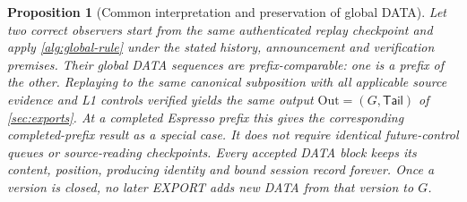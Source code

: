 \documentclass[11pt,a4paper]{article}
\newtheorem{proposition}[proposition]{Proposition}
\begin{document}
\begin{proposition}[Common interpretation and preservation of global DATA]
\label{prop:global-prefix}
Let two correct observers start from the same authenticated replay
checkpoint and apply \cref{alg:global-rule} under the stated history,
announcement and verification premises. Their global DATA sequences are
prefix-comparable: one is a prefix of the other. Replaying to the same canonical subposition with all applicable source
evidence and L1 controls verified yields the same output
$\mathrm{Out}=(G,\mathsf{Tail})$ of \cref{sec:exports}. At a completed Espresso prefix
this gives the corresponding completed-prefix result as a special case. It does not require identical
future-control queues or source-reading checkpoints. Every accepted DATA
block keeps its content, position, producing identity and bound
session record forever. Once a version is closed, no
later EXPORT adds new DATA from that version to $G$.
\end{proposition}
\end{document}
